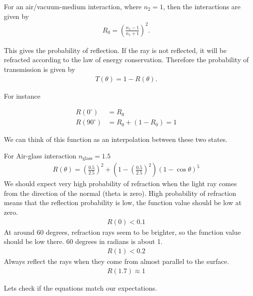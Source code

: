 \documentclass[../pbr.tex]{subfile}
\begin{document}
For an air/vacuum-medium interaction, where $n_2=1$, then the interactions are
given by
\begin{align*}
  R_0={\left(\frac{n_1-1}{n_1+1}\right)}^2.
\end{align*}

This gives the probability of reflection. If the ray is not reflected, it will
be refracted according to the law of energy conservation. Therefore the
probability of transmission is given by
\begin{align*}
  T(\theta)=1-R(\theta).
\end{align*}

For instance

\begin{align*}
  R\left(0^\circ\right)&=R_0\\
  R\left(90^\circ\right)&=R_0+\left(1-R_0\right)=1
\end{align*}

We can think of this function as an interpolation between these two states.

For Air-glass interaction $n_\text{glass}=1.5$
\begin{align*}
  R(\theta)={\left(\frac{0.5}{2.5}\right)}^2+\left(1-{\left(\frac{0.5}{2.5}\right)}^2\right){\left(1-\cos\theta\right)}^5
\end{align*}
We should expect very high probability of refraction when the light ray comes
from the direction of the normal (theta is zero). High probability of
refraction means that the reflection probability is low, the function value
should be low at zero.
\begin{align*}
  R(0)<0.1
\end{align*}
At around 60 degrees, refraction rays seem to be brighter, so the function
value should be low there. 60  degrees in radians is about 1.
\begin{align*}
  R(1)<0.2
\end{align*}
Always reflect the rays when they come from almost parallel to the surface.
\begin{align*}
  R(1.7)\approx 1
\end{align*}

Lets check if the equations match our expectations.

\begin{Figure}
  \begin{center}
    
  \end{center}
  \label{fig:05_2}
\end{Figure}
\end{document}
